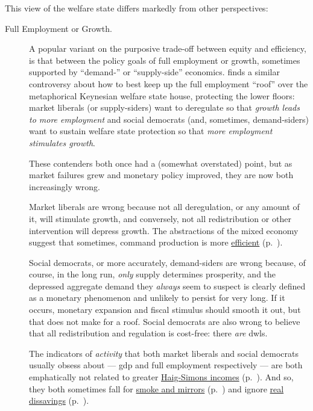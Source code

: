 This view of the welfare state differs markedly from other perspectives:
\begin{description}
	\item[Full Employment or Growth.]
	A popular variant on the purposive trade-off between equity and efficiency, is that between the policy goals of full employment or growth, sometimes supported by ``demand-'' or ``supply-side'' economics.
	\citeauthor{Offe2003} \citeyearpar[453]{Offe2003} finds a similar controversy about how to best keep up the full employment ``roof'' over the metaphorical Keynesian welfare state house, protecting the lower floors:
	market liberals (or supply-siders) want to deregulate so that \emph{growth leads to more employment} and social democrats (and, sometimes, demand-siders) want to sustain welfare state protection so that \emph{more employment stimulates growth}.

	These contenders both once had a (somewhat overstated) point, but as market failures grew and monetary policy improved, they are now both increasingly wrong.

	Market liberals are wrong because not all deregulation, or any amount of it, will stimulate growth, and conversely, not all redistribution or other intervention will depress growth.
	The abstractions of the mixed economy suggest that sometimes, command production is more \hyperref[sec:market-failures]{efficient} (p.~\pageref{sec:market-failures}).

	Social democrats, or more accurately, demand-siders are wrong because, of course, in the long run, \emph{only} supply determines prosperity, and the depressed aggregate demand they \emph{always} seem to suspect is clearly defined as a monetary phenomenon and unlikely to persist for very long.
	If it occurs, monetary expansion and fiscal stimulus should smooth it out, but that does not make for a roof.
	Social democrats are also wrong to believe that all redistribution and regulation is cost-free:
	there \emph{are} \glspl{dwl}.

	The indicators of \emph{activity} that both market liberals and social democrats usually obsess about --- \gls{gdp} and full employment respectively --- are both emphatically not related to greater \hyperref[sec:trade-offs]{Haig-Simons incomes} (p.~\pageref{sec:trade-offs}).
	And so, they both sometimes fall for \hyperref[sec:smoke-n-mirrors]{smoke and mirrors} (p.~\pageref{sec:smoke-n-mirrors}) and ignore \hyperref[sec:real-dissavings]{real dissavings} (p.~\pageref{sec:real-dissavings}).


\end{description}
